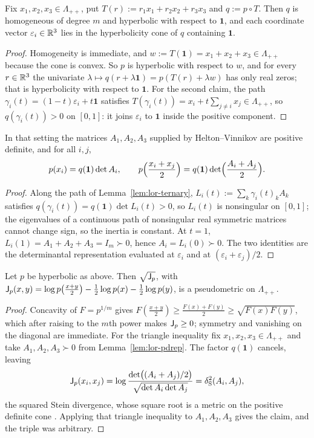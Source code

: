 \begin{lemma}\label{lem:lor-ternary}
Fix $x_1,x_2,x_3\in\Lambda_{++}$, put $T(r):=r_1x_1+r_2x_2+r_3x_3$ and
$q:=p\circ T$.  Then $q$ is homogeneous of degree $m$ and hyperbolic with
respect to $\mathbf 1$, and each coordinate vector $\varepsilon_i\in\mathbb R^3$ lies in
the hyperbolicity cone of $q$ containing $\mathbf 1$.
\end{lemma}
\begin{proof}
Homogeneity is immediate, and $w:=T(\mathbf 1)=x_1+x_2+x_3\in\Lambda_{++}$
because the cone is convex.  So $p$ is hyperbolic with respect to $w$, and for
every $r\in\mathbb R^3$ the univariate $\lambda\mapsto q(r+\lambda\mathbf 1)
=p(T(r)+\lambda w)$ has only real zeros; that is hyperbolicity with respect to
$\mathbf 1$.  For the second claim, the path
$\gamma_i(t)=(1-t)\varepsilon_i+t\mathbf 1$ satisfies
$T(\gamma_i(t))=x_i+t\sum_{j\ne i}x_j\in\Lambda_{++}$, so $q(\gamma_i(t))>0$ on
$[0,1]$: it joins $\varepsilon_i$ to $\mathbf 1$ inside the positive component.
\end{proof}

\begin{lemma}\label{lem:lor-pdrep}
In that setting the matrices $A_1,A_2,A_3$ supplied by Helton--Vinnikov are
positive definite, and for all $i,j$,
\[
p(x_i)=q(\mathbf 1)\det A_i,\qquad
p\Bigl(\frac{x_i+x_j}2\Bigr)=q(\mathbf 1)\det\Bigl(\frac{A_i+A_j}2\Bigr).
\]
\end{lemma}
\begin{proof}
Along the path of Lemma~\ref{lem:lor-ternary},
$L_i(t):=\sum_k\gamma_i(t)_kA_k$ satisfies
$q(\gamma_i(t))=q(\mathbf 1)\det L_i(t)>0$, so $L_i(t)$ is nonsingular on
$[0,1]$; the eigenvalues of a continuous path of nonsingular real symmetric
matrices cannot change sign, so the inertia is constant.  At $t=1$,
$L_i(1)=A_1+A_2+A_3=I_m\succ0$, hence $A_i=L_i(0)\succ0$.  The two identities
are the determinantal representation evaluated at $\varepsilon_i$ and at
$(\varepsilon_i+\varepsilon_j)/2$.
\end{proof}

\begin{theorem}\label{thm:lor-hyperbolic}
Let $p$ be hyperbolic as above.  Then $\sqrt{\mathsf{J}_p}$, with
$\mathsf{J}_p(x,y)=\log p\bigl(\frac{x+y}2\bigr)-\frac12\log p(x)-\frac12\log p(y)$, is a
pseudometric on $\Lambda_{++}$.
\end{theorem}
\begin{proof}
Concavity of $F=p^{1/m}$ gives
$F(\frac{x+y}2)\ge\frac{F(x)+F(y)}2\ge\sqrt{F(x)F(y)}$, which after raising to
the $m$th power makes $\mathsf{J}_p\ge0$; symmetry and vanishing on the diagonal are
immediate.  For the triangle inequality fix $x_1,x_2,x_3\in\Lambda_{++}$ and take
$A_1,A_2,A_3\succ0$ from Lemma~\ref{lem:lor-pdrep}.  The factor $q(\mathbf 1)$
cancels, leaving
\[
\mathsf{J}_p(x_i,x_j)
=\log\frac{\det\bigl((A_i+A_j)/2\bigr)}{\sqrt{\det A_i\det A_j}}
=\delta_{\mathrm S}^2(A_i,A_j),
\]
the squared Stein divergence, whose square root is a metric on the positive
definite cone \citep{SraSdiv}.  Applying that triangle inequality to
$A_1,A_2,A_3$ gives the claim, and the triple was arbitrary.
\end{proof}

